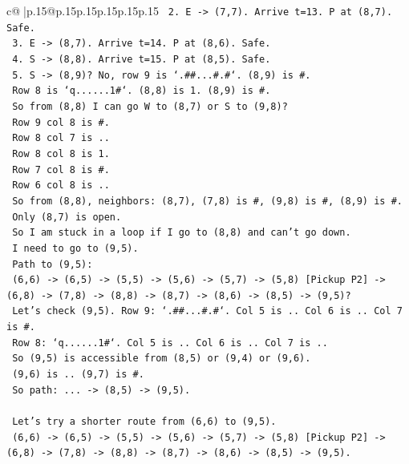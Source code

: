 \documentclass{article}
\begin{document}
{\begin{supertabular}{c@{$\;$}|p{.15\linewidth}@{}p{.15\linewidth}p{.15\linewidth}p{.15\linewidth}p{.15\linewidth}p{.15\linewidth}}
{{{\texttt{   2. E {-}> (7,7). Arrive t=13. P at (8,7). Safe.} \\
\texttt{   3. E {-}> (8,7). Arrive t=14. P at (8,6). Safe.} \\
\texttt{   4. S {-}> (8,8). Arrive t=15. P at (8,5). Safe.} \\
\texttt{   5. S {-}> (8,9)? No, row 9 is `.\#\#...\#.\#`. (8,9) is \#.} \\
\texttt{      Row 8 is `q......1\#`. (8,8) is 1. (8,9) is \#.} \\
\texttt{      So from (8,8) I can go W to (8,7) or S to (9,8)?} \\
\texttt{      Row 9 col 8 is \#.} \\
\texttt{      Row 8 col 7 is ..} \\
\texttt{      Row 8 col 8 is 1.} \\
\texttt{      Row 7 col 8 is \#.} \\
\texttt{      Row 6 col 8 is ..} \\
\texttt{      So from (8,8), neighbors: (8,7), (7,8) is \#, (9,8) is \#, (8,9) is \#.} \\
\texttt{      Only (8,7) is open.} \\
\texttt{      So I am stuck in a loop if I go to (8,8) and can't go down.} \\
\texttt{      I need to go to (9,5).} \\
\texttt{      Path to (9,5):} \\
\texttt{      (6,6) {-}> (6,5) {-}> (5,5) {-}> (5,6) {-}> (5,7) {-}> (5,8) {[}Pickup P2{]} {-}> (6,8) {-}> (7,8) {-}> (8,8) {-}> (8,7) {-}> (8,6) {-}> (8,5) {-}> (9,5)?} \\
\texttt{      Let's check (9,5). Row 9: `.\#\#...\#.\#`. Col 5 is .. Col 6 is .. Col 7 is \#.} \\
\texttt{      Row 8: `q......1\#`. Col 5 is .. Col 6 is .. Col 7 is ..} \\
\texttt{      So (9,5) is accessible from (8,5) or (9,4) or (9,6).} \\
\texttt{      (9,6) is .. (9,7) is \#.} \\
\texttt{      So path: ... {-}> (8,5) {-}> (9,5).} \\
\\ 
\texttt{      Let's try a shorter route from (6,6) to (9,5).} \\
\texttt{      (6,6) {-}> (6,5) {-}> (5,5) {-}> (5,6) {-}> (5,7) {-}> (5,8) {[}Pickup P2{]} {-}> (6,8) {-}> (7,8) {-}> (8,8) {-}> (8,7) {-}> (8,6) {-}> (8,5) {-}> (9,5).} \\
}}}
\end{supertabular}}
\end{document}
